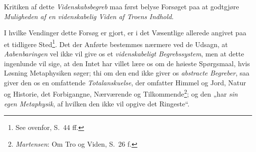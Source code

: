 \documentclass[12pt,a4paper]{book}
\newcommand{\opage}[1]{\marginnote{\footnotesize\textit{[#1]}}}
\begin{document}
\opage{102}Kritiken af dette \emph{Videnskabsbegreb} maa først belyse Forsøget paa at godtgjøre \emph{Muligheden af en videnskabelig Viden af Troens Indhold}.

I hvilke Vendinger dette Forsøg er gjort, er i det Væsentlige allerede angivet paa et
tidligere Sted\footnote{See ovenfor, S.\ 44 ff.}. Det der Anførte bestemmes nærmere ved de
Udsagn, at \emph{Aabenbaringen} vel ikke vil give os et \emph{videnskabeligt Begrebssystem}, men
at dette ingenlunde vil sige, at den Intet har villet lære os om de høieste Spørgsmaal,
hvis Løsning Metaphysiken søger; thi om den end ikke giver os \emph{abstracte Begreber},
saa giver den os en omfattende \emph{Totalanskuelse}, der omfatter Himmel og Jord, Natur og Historie, det Forbigangne, Nærværende og Tilkommende\footnote{\emph{Martensen}: Om Tro og Viden, S.\ 26 f.}; og den „har \emph{sin egen Metaphysik}, af hvilken den ikke vil opgive det Ringeste“.
\end{document}
